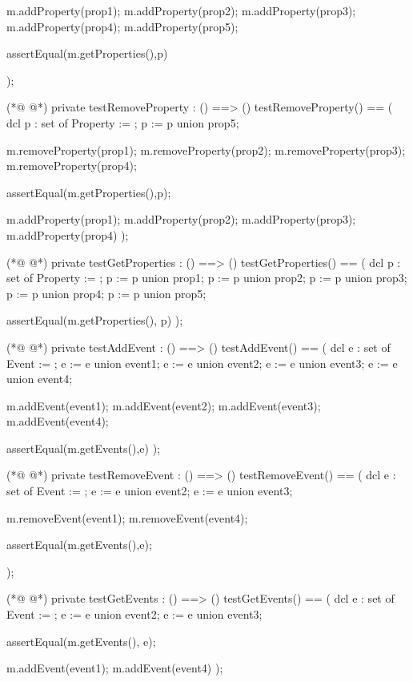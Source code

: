 \begin{vdmpp}[breaklines=true]
   m.addProperty(prop1);
   m.addProperty(prop2);
   m.addProperty(prop3);
   m.addProperty(prop4);
   m.addProperty(prop5);
   
   assertEqual(m.getProperties(),p)
   
  
  );
 
(*@
\label{testRemoveProperty:220}
@*)
 private testRemoveProperty : () ==> ()
  testRemoveProperty() ==
  (
   dcl p : set of Property := {};
   p := p union {prop5};
   
   m.removeProperty(prop1);
   m.removeProperty(prop2);
   m.removeProperty(prop3);
   m.removeProperty(prop4);
   
   assertEqual(m.getProperties(),p);
   
   m.addProperty(prop1);
   m.addProperty(prop2);
   m.addProperty(prop3);
   m.addProperty(prop4)
  );
 
 
(*@
\label{testGetProperties:240}
@*)
 private testGetProperties : () ==> ()
  testGetProperties() == 
  (
   dcl p : set of Property := {};
     p := p union {prop1};
     p := p union {prop2};
     p := p union {prop3};
     p := p union {prop4};
     p := p union {prop5};
       
     assertEqual(m.getProperties(), p)
  );
 
(*@
\label{testAddEvent:253}
@*)
 private testAddEvent : () ==> ()
  testAddEvent() ==
  (
   dcl e : set of Event := {};
   e := e union {event1};
   e := e union {event2};
   e := e union {event3};
   e := e union {event4};
   
   m.addEvent(event1);
   m.addEvent(event2);
   m.addEvent(event3);
   m.addEvent(event4);

   assertEqual(m.getEvents(),e)
  );
 
  
(*@
\label{testRemoveEvent:271}
@*)
 private testRemoveEvent : () ==> ()
  testRemoveEvent() ==
  (
   dcl e : set of Event := {};
   e := e union {event2};
   e := e union {event3};

   
   m.removeEvent(event1);
   m.removeEvent(event4);
   
   assertEqual(m.getEvents(),e);
   
   
  );
 
(*@
\label{testGetEvents:287}
@*)
 private testGetEvents : () ==> ()
  testGetEvents() == 
  (
   dcl e : set of Event := {};
     e := e union {event2};
     e := e union {event3};
     
     assertEqual(m.getEvents(), e);
     
     m.addEvent(event1);
   m.addEvent(event4)
  );
 

\end{vdmpp}
